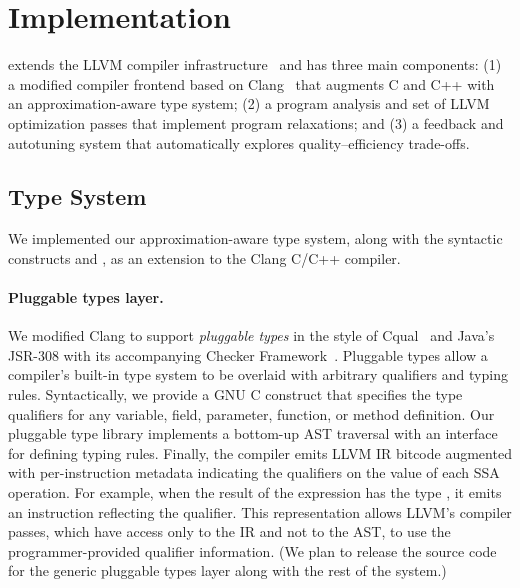 \section{Implementation}
\label{accept:sec:impl}

\sysname extends the LLVM compiler
infrastructure~\cite{llvm} and has three main components:
(1) a modified compiler frontend based on Clang~\cite{clang}
that augments C and C++ with an
approximation-aware type system;
(2) a program analysis and set of LLVM optimization passes that implement
program relaxations; and
(3) a feedback and autotuning system that automatically explores
quality--efficiency trade-offs.

\subsection{Type System}

We implemented our approximation-aware type system, along with the syntactic
constructs  and , as an extension to the Clang
C/C++ compiler.

\paragraph{Pluggable types layer.}

We modified Clang to support \emph{pluggable types} in the style of
Cqual~\cite{cqual} and Java's JSR-308 with its accompanying Checker
Framework~\cite{jsr308, papi}.
Pluggable types allow a compiler's built-in type system to be overlaid with
arbitrary qualifiers and typing rules. Syntactically, we
provide a GNU C  construct that specifies the
type qualifiers for any variable, field, parameter, function, or method
definition. Our pluggable type library implements a bottom-up AST traversal
with an interface for defining typing rules.
Finally, the compiler emits LLVM IR bitcode
augmented with per-instruction metadata indicating the qualifiers on the
value of each SSA operation. For example, when the result of the
expression  has the type , it emits an
 instruction reflecting the qualifier. This
representation allows LLVM's compiler passes, which have access only to the IR
and not to the AST, to use the programmer-provided qualifier
information.
(We plan to release the source code for the generic
pluggable types layer along with the rest of the
system.)


